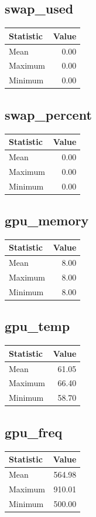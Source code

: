 \documentclass[11pt]{article}
\begin{document}
\subsection{swap_used}
\begin{tabular}{lr}
\toprule
Statistic & Value \\
\midrule
Mean & 0.00 \\
Maximum & 0.00 \\
Minimum & 0.00 \\
\bottomrule
\end{tabular}


\subsection{swap_percent}
\begin{tabular}{lr}
\toprule
Statistic & Value \\
\midrule
Mean & 0.00 \\
Maximum & 0.00 \\
Minimum & 0.00 \\
\bottomrule
\end{tabular}


\subsection{gpu_memory}
\begin{tabular}{lr}
\toprule
Statistic & Value \\
\midrule
Mean & 8.00 \\
Maximum & 8.00 \\
Minimum & 8.00 \\
\bottomrule
\end{tabular}


\subsection{gpu_temp}
\begin{tabular}{lr}
\toprule
Statistic & Value \\
\midrule
Mean & 61.05 \\
Maximum & 66.40 \\
Minimum & 58.70 \\
\bottomrule
\end{tabular}


\subsection{gpu_freq}
\begin{tabular}{lr}
\toprule
Statistic & Value \\
\midrule
Mean & 564.98 \\
Maximum & 910.01 \\
Minimum & 500.00 \\
\bottomrule
\end{tabular}
\end{document}
